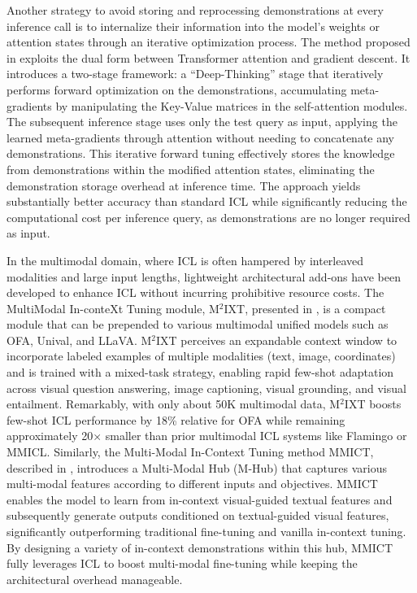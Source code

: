 \documentclass[11pt]{article}
\begin{document}
Another strategy to avoid storing and reprocessing demonstrations at every inference call is to internalize their information into the model's weights or attention states through an iterative optimization process. The method proposed in \cite{ref65} exploits the dual form between Transformer attention and gradient descent. It introduces a two-stage framework: a ``Deep-Thinking'' stage that iteratively performs forward optimization on the demonstrations, accumulating meta-gradients by manipulating the Key-Value matrices in the self-attention modules. The subsequent inference stage uses only the test query as input, applying the learned meta-gradients through attention without needing to concatenate any demonstrations. This iterative forward tuning effectively stores the knowledge from demonstrations within the modified attention states, eliminating the demonstration storage overhead at inference time. The approach yields substantially better accuracy than standard ICL while significantly reducing the computational cost per inference query, as demonstrations are no longer required as input.

In the multimodal domain, where ICL is often hampered by interleaved modalities and large input lengths, lightweight architectural add-ons have been developed to enhance ICL without incurring prohibitive resource costs. The MultiModal In-conteXt Tuning module, M\(^2\)IXT, presented in \cite{ref107}, is a compact module that can be prepended to various multimodal unified models such as OFA, Unival, and LLaVA. M\(^2\)IXT perceives an expandable context window to incorporate labeled examples of multiple modalities (text, image, coordinates) and is trained with a mixed-task strategy, enabling rapid few-shot adaptation across visual question answering, image captioning, visual grounding, and visual entailment. Remarkably, with only about 50K multimodal data, M\(^2\)IXT boosts few-shot ICL performance by 18\% relative for OFA while remaining approximately 20× smaller than prior multimodal ICL systems like Flamingo or MMICL. Similarly, the Multi-Modal In-Context Tuning method MMICT, described in \cite{ref108}, introduces a Multi-Modal Hub (M-Hub) that captures various multi-modal features according to different inputs and objectives. MMICT enables the model to learn from in-context visual-guided textual features and subsequently generate outputs conditioned on textual-guided visual features, significantly outperforming traditional fine-tuning and vanilla in-context tuning. By designing a variety of in-context demonstrations within this hub, MMICT fully leverages ICL to boost multi-modal fine-tuning while keeping the architectural overhead manageable.
\end{document}
